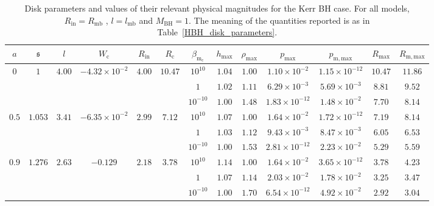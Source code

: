 \documentclass[twocolumn,aps,showpacs,showkeys,prd,superscriptaddress,byrevtex, amsmath]{revtex4-1}
\begin{document}
\begin{table}[t]
\caption{Disk parameters and values of their relevant physical magnitudes for the Kerr BH case. For all models, $R_{\mathrm{in}} = R_{\mathrm{mb}}$ , $l = l_{\mathrm{mb}}$ and $M_{\mathrm{BH}} = 1$. The meaning of the quantities reported is as in Table~\ref{HBH_disk_parameters}.}        
\label{KBH_disk_parameters}      
\centering          
\begin{tabular}{c c c c c c  c c c c c c c}
\hline\hline       
 $a$ & $\mathfrak{s}$ &  $l$ & $W_{\mathrm{c}}$ & $R_{\mathrm{in}}$ & $R_{\mathrm{c}}$ &  $\beta_{\mathrm{m_{\mathrm{c}}}}$ & $h_{\mathrm{max}}$ & $\rho_{\mathrm{max}}$ & $p_{\mathrm{max}}$ & $p_{\mathrm{m, max}}$ & $R_{\mathrm{max}}$ & $R_{\mathrm{m, max}}$\\ 
\hline           
$0$ & $1$ & $4.00$ & $-4.32 \times 10^{-2}$ & $4.00$ & $10.47$ & $10^{10}$ & $1.04$ & $1.00$ & $1.10 \times 10^{-2}$ & $1.15 \times 10^{-12}$ & $10.47$ & $11.86$\\ 

 &  &  &  &  &  & $1$ & $1.02$ & $1.11$ & $6.29 \times 10^{-3}$ & $5.69 \times 10^{-3}$ & $8.81$ & $9.52$\\ 

 &  &  & &  &  & $10^{-10}$ & $1.00$ & $1.48$ & $1.83 \times 10^{-12}$ & $1.48 \times 10^{-2}$ & $7.70$ & $8.14$\\ 

 $0.5$ & $1.053$ & $3.41$ & $-6.35 \times 10^{-2}$ & $2.99$ & $7.12$ & $10^{10}$ & $1.07$ & $1.00$ & $1.64 \times 10^{-2}$ & $1.72 \times 10^{-12}$ & $7.19$ & $8.14$\\ 

 &  &  & &  &  & $1$ & $1.03$ & $1.12$ & $9.43 \times 10^{-3}$ & $8.47 \times 10^{-3}$ & $6.05$ & $6.53$ \\ 
 
 &  &  & &  &  & $10^{-10}$ & $1.00$ & $1.53$ & $2.81 \times 10^{-12}$ & $2.23 \times 10^{-2}$ & $5.29$ & $5.59$\\ 
 
$0.9$ & $1.276$ & $2.63$ & $-0.129$ & $2.18$ & $3.78$ & $10^{10}$ & $1.14$ & $1.00$ & $1.64 \times 10^{-2}$ & $3.65 \times 10^{-12}$ & $3.78$ & $4.23$\\ 

 &  &  &  &  &  & $1$ & $1.07$ & $1.14$ & $2.03 \times 10^{-2}$ & $1.78 \times 10^{-2}$ & $3.25$ & $3.47$\\ 

 &  &  &  &  &  & $10^{-10}$ & $1.00$ & $1.70$ & $6.54 \times 10^{-12}$ & $4.92 \times 10^{-2}$ & $2.92$ & $3.04$ \\ 


\end{tabular}
\end{table}
\end{document}
